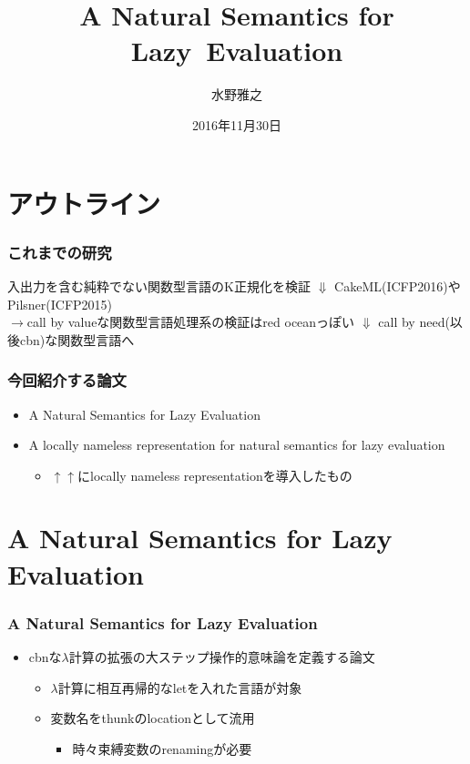 \documentclass[dvipdfmx,cjk,xcolor=dvipsnames,envcountsect,notheorems,12pt]{beamer}
\title{A Natural Semantics for \mbox{Lazy Evaluation}}
\author{水野雅之}
\date{2016年11月30日}
\theoremstyle{definition}
\begin{document}
\frame[plain]{\titlepage}%

\section*{アウトライン}


\begin{frame}
	\frametitle{これまでの研究}
	\begin{center}
		\Large 入出力を含む純粋でない関数型言語の\mbox{K正規化}を検証
		\vfill
		$\Downarrow$
		\vfill
		CakeML(ICFP2016)やPilsner(ICFP2015)\\
		$\rightarrow$call by valueな関数型言語処理系の検証はred oceanっぽい
		\vfill
		$\Downarrow$
		\vfill
		call by need(以後cbn)な関数型言語へ
	\end{center}
\end{frame}

\begin{frame}
	\frametitle{今回紹介する論文}
	\begin{itemize}
		\item A Natural Semantics for Lazy Evaluation
		\item A locally nameless representation for natural semantics for lazy evaluation
			\begin{itemize}
				\item $\uparrow\uparrow$にlocally nameless representationを導入したもの
			\end{itemize}
	\end{itemize}
\end{frame}

\section{A Natural Semantics for Lazy Evaluation}

\begin{frame}
	\frametitle{A Natural Semantics for Lazy Evaluation}
	\begin{itemize}
		\item cbnな$\lambda$計算の拡張の大ステップ操作的意味論を定義する論文
			\begin{itemize}
				\item $\lambda$計算に相互再帰的なletを入れた言語が対象
				\item 変数名をthunkのlocationとして流用
					\begin{itemize}
						\item 時々束縛変数のrenamingが必要
					\end{itemize}
			\end{itemize}
	\end{itemize}
\end{frame}
\end{document}

